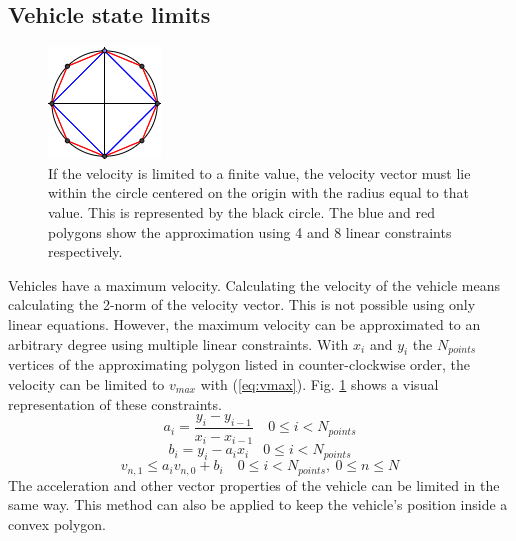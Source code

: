 \subsection{Vehicle state limits}
\begin{figure}
    \centering
        \includegraphics[width=0.33\columnwidth]{img/circlelinear2}
    \caption{If the velocity is limited to a finite value, the velocity vector must lie within the circle centered on the origin with the radius equal to that value. This is represented by the black circle. The blue and red polygons show the approximation using 4 and 8 linear constraints respectively.}\label{fig:circlelinear}
\end{figure}
Vehicles have a maximum velocity. Calculating the velocity of the vehicle means calculating the 2-norm of the velocity vector. This is not possible using only linear equations. However, the maximum velocity can be approximated to an arbitrary degree using multiple linear constraints. With $x_i$ and $y_i$ the $N_{points}$ vertices of the approximating polygon listed in counter-clockwise order, the velocity can be limited to $v_{max}$ with (\ref{eq:vmax}). Fig. \ref{fig:circlelinear} shows a visual representation of these constraints.
\begin{equation}
\label{eq:lin-a}
a_i = \dfrac{y_{i} - y_{i-1}}{x_{i} - x_{i-1}} \quad 0 \leq i < N_{points}
\end{equation}
\begin{equation}
\label{eq:lin-b}
b_i = y_{i} - a_i x_i  \quad 0 \leq i < N_{points}
\end{equation}
\begin{equation}
\label{eq:vmax}
v_{n, 1} \leq a_i v_{n,0} + b_i  \quad 0 \leq i < N_{points}, ~ 0 \leq n \leq N
\end{equation}
The acceleration and other vector properties of the vehicle can be limited in the same way. This method can also be applied to keep the vehicle's position inside a convex polygon.
